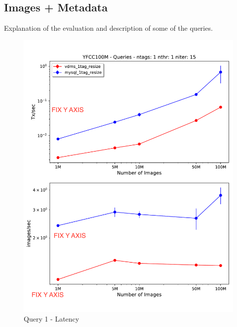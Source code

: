 \subsection{Images + Metadata}

Explanation of the evaluation and description of some of the queries.

\begin{figure}[]
\centering
\includegraphics[width=\columnwidth]{figures/q1_latency}
\caption{Query 1 - Latency}
\label{fig:q1_latency}
\end{figure}

